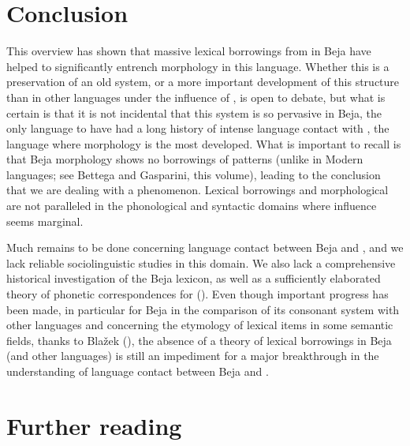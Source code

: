 \documentclass[output=paper]{langsci/langscibook}
\begin{document}
\section{Conclusion}

This overview has shown that massive lexical borrowings from  in Beja have helped to significantly entrench  morphology in this language. Whether this is a preservation of an old  system, or a more important development of this structure than in other  languages under the influence of , is open to debate, but what is certain is that it is not incidental that this system is so pervasive in Beja, the only  language to have had a long history of intense language contact with , the  language where  morphology is the most developed. What is important to recall is that Beja  morphology shows no borrowings of  patterns (unlike in Modern  languages; see Bettega and Gasparini, this volume), leading to the conclusion that we are dealing with a  phenomenon. Lexical borrowings and morphological  are not paralleled in the phonological and syntactic domains where  influence seems marginal.

Much remains to be done concerning language contact between Beja and , and we lack reliable sociolinguistic studies in this domain. We also lack a comprehensive historical investigation of the Beja lexicon, as well as a sufficiently elaborated theory of phonetic correspondences for  (\citeyear[267]{Cohen1988}). Even though important progress has been made, in particular for Beja in the comparison of its consonant system with other  languages and concerning the etymology of lexical items in some semantic fields, thanks to Blažek (\citeyear{Blažek2000,Blažek2003kinship,Blažek2003fauna,Blažek2006BB2,Blažek2006BB3}), the absence of a theory of lexical borrowings in Beja (and other  languages) is still an impediment for a major breakthrough in the understanding of language contact between Beja and .

\section*{Further reading}
\end{document}
